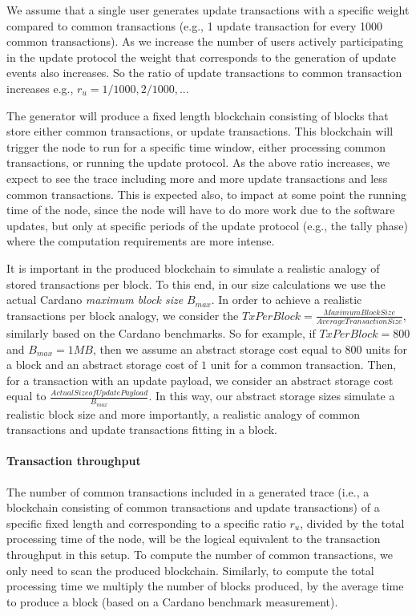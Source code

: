 We assume that a single user generates update transactions with a specific
weight compared to common transactions (e.g., 1 update transaction for every
1000 common transactions). As we increase the number of users actively
participating in the update protocol the weight that corresponds to the
generation of update events also increases. So the ratio of update transactions
to common transaction increases e.g., $r_u = 1/1000, 2/1000, ...$

The generator will produce a fixed length blockchain consisting of blocks that
store either common transactions, or update transactions. This blockchain will
trigger the node to run for a specific time window, either processing common
transactions, or running the update protocol. As the above ratio increases, we
expect to see the trace including more and more update transactions and less
common transactions. This is expected also, to impact at some point the running
time of the node, since the node will have to do more work due to the software
updates, but only at specific periods of the update protocol (e.g., the tally
phase) where the computation requirements are more intense.

It is important in the produced blockchain to simulate a realistic analogy of
stored transactions per block. To this end, in our size calculations we use the
actual Cardano \emph{maximum block size} $B_{max}$. In order to achieve a
realistic transactions per block analogy, we consider the
$TxPerBlock = \frac{Maximum Block Size}{Average Transaction Size}$, similarly
based on the Cardano benchmarks. So for example, if $TxPerBlock = 800$ and
$B_{max} = 1MB$, then we assume an abstract storage cost equal to $800$ units
for a block and an abstract storage cost of $1$ unit for a common transaction.
Then, for a transaction with an update payload, we consider an abstract storage
cost equal to $\frac{Actual Size of Update Payload}{B_{max}}$. In this way, our
abstract storage sizes simulate a realistic block size and more importantly, a
realistic analogy of common transactions and update transactions fitting in a
block.

\paragraph{Transaction throughput}
The number of common transactions included in a generated trace (i.e., a
blockchain consisting of common transactions and update transactions) of a
specific fixed length and corresponding to a specific ratio $r_u$, divided by
the total processing time of the node, will be the logical equivalent to the
transaction throughput in this setup. To compute the number of common
transactions, we only need to scan the produced blockchain. Similarly, to
compute the total processing time we multiply the number of blocks produced, by
the average time to produce a block (based on a Cardano benchmark measurement).

